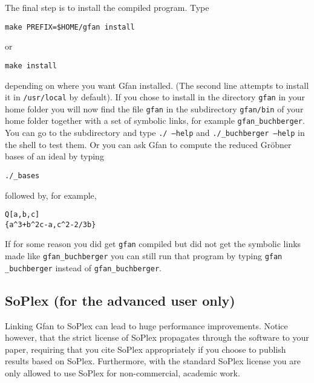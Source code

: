 The final step is to install the compiled program. Type
\color{red}
\begin{verbatim}
make PREFIX=$HOME/gfan install
\end{verbatim}
\color{black}or
\begin{verbatim}
make install
\end{verbatim}
depending on where you want Gfan installed. (The second line attempts to install it in {\tt /usr/local} by default). If you chose to install in
the directory {\tt gfan} in your home folder \color{red}you will now find the
file {\tt gfan} in the subdirectory {\tt gfan/bin} of your home folder together with a set of symbolic links\color{black},
for example {\tt gfan\_buchberger}.
You can go to the subdirectory and type {\tt ./\exename{} --help} and {\tt ./\exename{}\_buchberger --help} in
the shell to test them. Or you can ask Gfan to compute the reduced Gr\"obner bases of an ideal by typing
\begin{alltt}
./\exename{}\_bases
\end{alltt}
followed by, for example,
\begin{verbatim}
Q[a,b,c]
{a^3+b^2c-a,c^2-2/3b}
\end{verbatim}
\begin{remark}
If for some reason you did get {\tt gfan} compiled but did not get the symbolic links made like {\tt gfan\_buchberger} you can still run that program by typing {\tt gfan \_buchberger} instead of {\tt gfan\_buchberger}.
\end{remark}


\subsection{SoPlex (for the advanced user only)}
\label{subsec:soplex}
Linking Gfan to SoPlex can lead to huge performance
improvements. Notice however, that the strict license of SoPlex
propagates through the software to your paper, requiring that you cite
SoPlex appropriately if you choose to publish results based on SoPlex.
Furthermore, with the standard SoPlex license you are only allowed to
use SoPlex for non-commercial, academic work.

